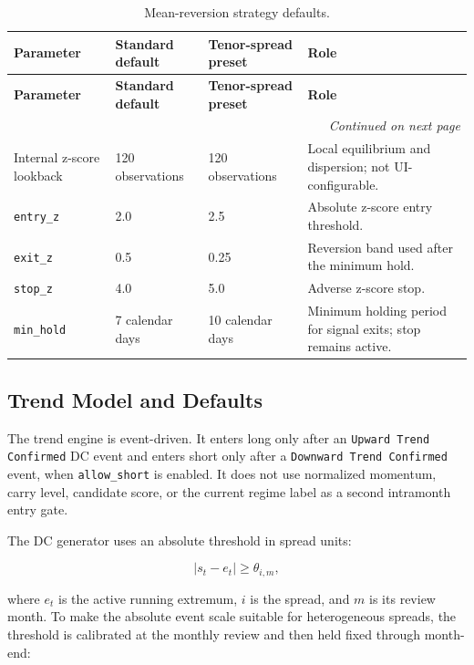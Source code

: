 {\small
\setlength{\LTleft}{0pt}
\setlength{\LTright}{0pt}
\setlength{\tabcolsep}{5pt}
\renewcommand{\arraystretch}{1.15}
\begin{longtable}{p{} p{} p{} p{}}
\caption{Mean-reversion strategy defaults.}\label{tab:pairs-mr-defaults-overleaf} \\
\toprule
\textbf{Parameter} & \textbf{Standard default} & \textbf{Tenor-spread preset} & \textbf{Role} \\
\midrule
\endfirsthead
\toprule
\textbf{Parameter} & \textbf{Standard default} & \textbf{Tenor-spread preset} & \textbf{Role} \\
\midrule
\endhead
\midrule
\multicolumn{4}{r}{\textit{Continued on next page}} \\
\midrule
\endfoot
\bottomrule
\endlastfoot
Internal z-score lookback & 120 observations & 120 observations & Local equilibrium and dispersion; not UI-configurable. \\
\texttt{entry\_z} & 2.0 & 2.5 & Absolute z-score entry threshold. \\
\texttt{exit\_z} & 0.5 & 0.25 & Reversion band used after the minimum hold. \\
\texttt{stop\_z} & 4.0 & 5.0 & Adverse z-score stop. \\
\texttt{min\_hold} & 7 calendar days & 10 calendar days & Minimum holding period for signal exits; stop remains active. \\
\end{longtable}
}

\subsection{Trend Model and Defaults}
\label{sec:pairs-trend-model}

The trend engine is event-driven. It enters long only after an \texttt{Upward Trend
Confirmed} DC event and enters short only after a \texttt{Downward Trend Confirmed}
event, when \texttt{allow\_short} is enabled. It does not use normalized momentum,
carry level, candidate score, or the current regime label as a second intramonth
entry gate.

The DC generator uses an absolute threshold in spread units:

\begin{equation}
\left|s_t-e_t\right| \ge \theta_{i,m},
\end{equation}

where $e_t$ is the active running extremum, $i$ is the spread, and $m$ is its
review month. To make the absolute event scale suitable for heterogeneous spreads,
the threshold is calibrated at the monthly review and then held fixed through
month-end:

